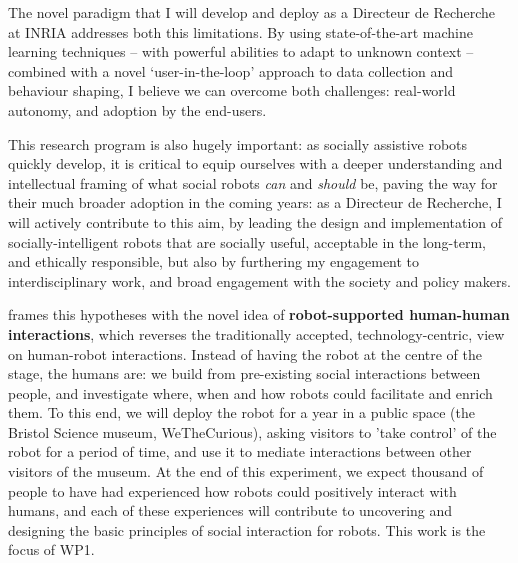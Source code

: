 The novel paradigm that I will develop and deploy as a Directeur de
Recherche at INRIA addresses both this limitations. By using state-of-the-art
machine learning techniques -- with powerful abilities to adapt to unknown context
-- combined with a novel `user-in-the-loop' approach to data collection and
behaviour shaping, I believe we can overcome both challenges: real-world
autonomy, and adoption by the end-users.

This research program is also hugely important: as socially assistive robots quickly
develop, it is critical to equip ourselves with a deeper understanding and
intellectual framing of what social robots \emph{can} and \emph{should} be,
paving the way for their much broader adoption in the coming years: as a
Directeur de Recherche, I will actively contribute to this aim, by leading the
design and implementation of socially-intelligent robots that are socially
useful, acceptable in the long-term, and ethically responsible, but also by
furthering my engagement to interdisciplinary work, and broad engagement with
the society and policy makers.














\project frames this hypotheses with the novel
idea of \textbf{robot-supported human-human interactions}, which reverses the
traditionally accepted, technology-centric, view on human-robot interactions.
Instead of having the robot at the centre of the stage, the humans are: we build
from pre-existing social interactions between people, and investigate where,
when and how robots could facilitate and enrich them. To this end, we will
deploy the \project robot for a year in a public space (the Bristol Science
museum, WeTheCurious), asking visitors to 'take control' of the robot for a
period of time, and use it to mediate interactions between other visitors of the
museum.  At the end of this experiment, we expect thousand of people to have had
experienced how robots could positively interact with humans, and each of these experiences
will contribute to uncovering and designing the basic principles of social interaction for
robots. This work is the focus of WP1.

